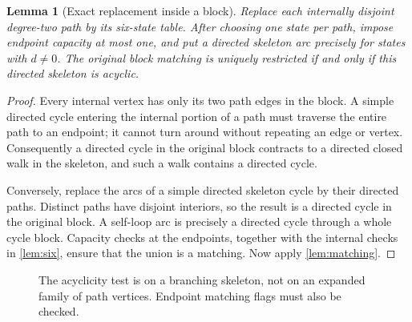 \documentclass[11pt,letterpaper]{article}
\newtheorem{lemma}[lemma]{Lemma}\aliascntresetthe{lemma}
\theoremstyle{definition}
\theoremstyle{remark}
\begin{document}
\begin{lemma}[Exact replacement inside a block]
\label{lem:replacement}
Replace each internally disjoint degree-two path by its six-state table. After choosing one state per path, impose endpoint capacity at most one, and put a directed skeleton arc precisely for states with $d\ne0$. The original block matching is uniquely restricted if and only if this directed skeleton is acyclic.
\end{lemma}
\begin{proof}
Every internal vertex has only its two path edges in the block. A simple directed cycle entering the internal portion of a path must traverse the entire path to an endpoint; it cannot turn around without repeating an edge or vertex. Consequently a directed cycle in the original block contracts to a directed closed walk in the skeleton, and such a walk contains a directed cycle.

Conversely, replace the arcs of a simple directed skeleton cycle by their directed paths. Distinct paths have disjoint interiors, so the result is a directed cycle in the original block. A self-loop arc is precisely a directed cycle through a whole cycle block. Capacity checks at the endpoints, together with the internal checks in \cref{lem:six}, ensure that the union is a matching. Now apply \cref{lem:matching}.
\end{proof}

\begin{figure}[htbp]
\centering
{}
\caption{The acyclicity test is on a branching skeleton, not on an expanded family of path vertices. Endpoint matching flags must also be checked.}
\label{fig:skeleton}
\end{figure}
\end{document}
